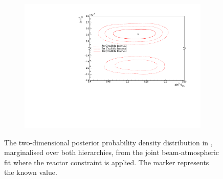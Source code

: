 \begin{figure}[h]
  \begin{subfigure}[t]{0.96\textwidth}
    \includegraphics[width=\textwidth, trim={0mm 0mm 0mm 0mm}, clip,page=1]{Figures/OA/JointFit_wRC/Contours_2D_th23_dm32_BH_1_wRC_UnSmeared_CredibleInterval.pdf}
  \end{subfigure}
  \caption{The two-dimensional posterior probability density distribution in , marginalised over both hierarchies, from the joint beam-atmospheric fit where the reactor constraint is applied. The marker represents the known value.}
  \label{fig:OscillationAnalysis_JointFit_wRC_TH23DM32}
\end{figure}

\clearpage

